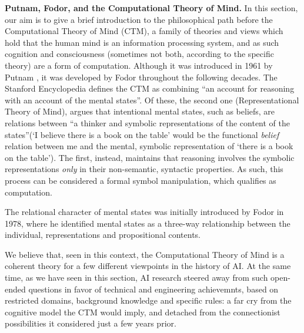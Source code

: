 \documentclass[../main.tex]{subfiles}
\begin{document}
\vspace{4pt}
\textbf{Putnam, Fodor, and the Computational Theory of Mind.} In this section, our aim is to give a brief introduction to the philosophical path before the Computational Theory of Mind (CTM), a family of theories and views which hold that the human mind is an information processing system, and as such cognition and consciousness (sometimes not both, according to the specific theory) are a form of computation. Although it was introduced in 1961 by Putnam \cite{horstComputationalTheoryMind2003}, it was developed by Fodor throughout the following decades. The Stanford Encyclopedia defines the CTM as combining ``an account for reasoning with an account of the mental states''. Of these, the second one (Representational Theory of Mind), argues that intentional mental states, such as beliefs, are relations between ``a thinker and symbolic representations of the content of the states''(`I believe there is a book on the table' would be the functional \textit{belief} relation between me and the mental, symbolic representation of `there is a book on the table'). The first, instead, maintains that reasoning involves the symbolic representations \textit{only} in their non-semantic, syntactic properties. As such, this process can be considered a formal symbol manipulation, which qualifies as computation.

The relational character of mental states was initially introduced by Fodor in 1978\cite{fodorPropositionalAttitudes1978}, where he identified mental states as a three-way relationship between the individual, representations and propositional contents.

\vspace{5pt}
We believe that, seen in this context, the Computational Theory of Mind is a coherent theory for a few different viewpoints in the history of AI. At the same time, as we have seen in this section, AI research steered away from such open-ended questions in favor of technical and engineering achievemnts, based on restricted domains, background knowledge and specific rules: a far cry from the cognitive model the CTM would imply, and detached from the connectionist possibilities it considered just a few years prior.
\end{document}
